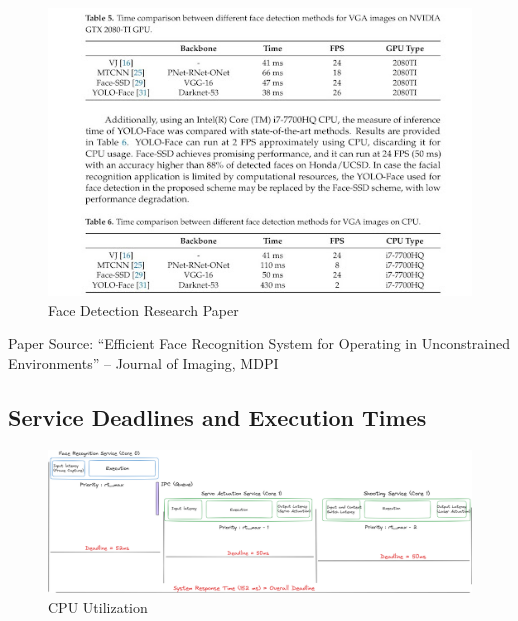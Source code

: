 \documentclass[a4paper,11pt]{article}%
\begin{document}
\begin{itemize}
          \begin{figure}[H]
              \centering
              \includegraphics[scale=0.6]{figures/face_detection_service_papeere.png}
              \caption{Face Detection Research Paper}
          \end{figure}
          Paper Source: “Efficient Face Recognition System for Operating in Unconstrained Environments” – Journal of Imaging, MDPI

\end{itemize}

\subsection{Service Deadlines and Execution Times}

\begin{figure}[H]
    \centering
    \includegraphics[scale=0.06]{figures/response_time.png}
    \caption{CPU Utilization}
\end{figure}
\end{document}
